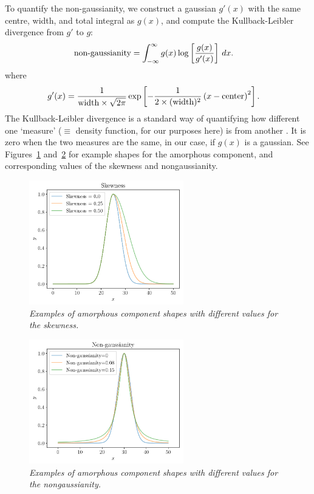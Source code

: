 \documentclass[review]{elsarticle}
\newcommand{\x}{x}
\begin{document}
To quantify the non-gaussianity, we construct a gaussian
$g'(\x)$
with the same centre, width, and total integral as $g(\x)$, and compute the
Kullback-Leibler divergence from $g'$ to $g$:
\begin{align}
\textnormal{non-gaussianity} &= 
    \int_{-\infty}^\infty g(\x) \log\left[\frac{g(\x)}{g'(\x)}\right] \, d\x.
\end{align}
where
\begin{align}
g'(\x) &= \frac{1}{\textnormal{width} \times \sqrt{2\pi}}
            \exp\left[-\frac{1}{2\times (\textnormal{width})^2}
                    \left(\x - \textnormal{center}\right)^2\right].
\end{align}
The Kullback-Leibler divergence is a standard way of quantifying how
different one `measure' ($\equiv$ density function, for our purposes here) is from another \citep{knuth2012foundations}.
It is zero when the two measures are the same, in our case,
if $g(\x)$ is a gaussian. See Figures~\ref{fig:skewness} and~\ref{fig:nongaussianity} for example
shapes for the amorphous component, and corresponding values of the skewness
and nongaussianity.

\begin{figure}[!ht]
\centering
\includegraphics[width=0.6\textwidth]{figures/skewness.pdf}
\caption{\it Examples of amorphous component shapes with different values
for the skewness.\label{fig:skewness}}
\end{figure}

\begin{figure}[!ht]
\centering
\includegraphics[width=0.6\textwidth]{figures/nongaussianity.pdf}
\caption{\it Examples of amorphous component shapes with different values
for the nongaussianity.\label{fig:nongaussianity}}
\end{figure}
\end{document}
